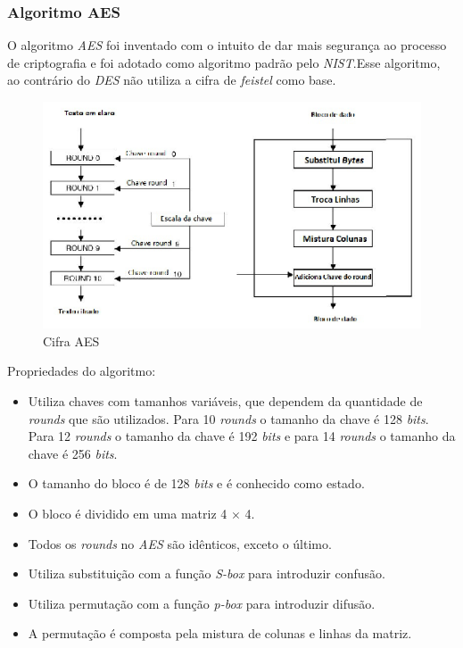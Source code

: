 \subsubsection{Algoritmo AES}

O algoritmo \textit{AES} foi inventado com o intuito de dar mais segurança ao processo de criptografia e foi adotado como algoritmo padrão pelo \textit{NIST}.Esse algoritmo, ao contrário do \textit{DES} não utiliza a cifra de \textit{feistel} como base. 

\begin{figure}[h]
	\centering
	\includegraphics[scale=2]
		{figuras/aes_cipher.eps}
		\caption[Cifra\textit{AES}]{Cifra AES\protect\footnotemark} 
\end{figure}

Propriedades do algoritmo:

\begin{itemize}
	\item Utiliza chaves com tamanhos variáveis, que dependem da quantidade de \textit{rounds} que são utilizados. Para 10 \textit{rounds} o tamanho da chave é 128 \textit{bits}. Para 12 \textit{rounds} o tamanho da chave é 192 \textit{bits} e para 14 \textit{rounds} o tamanho da chave é 256 \textit{bits}.
	\item O tamanho do bloco é de 128 \textit{bits} e é conhecido como estado.
	\item O bloco é dividido em uma matriz 4 $\times$ 4.
	\item Todos os \textit{rounds} no \textit{AES} são idênticos, exceto o último.
	\item Utiliza substituição com a função \textit{S-box} para introduzir confusão.
	\item Utiliza permutação com a função \textit{p-box} para introduzir difusão. 
	\item A permutação é composta pela mistura de colunas e linhas da matriz.
\end{itemize}
